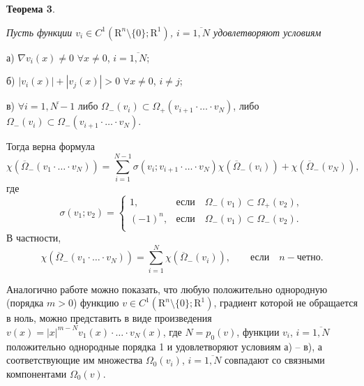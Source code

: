 {\bf Теорема 3}. {\it Пусть функции 
$v_i\in C^1(\mathrm{R}^n\setminus\{0\};\mathrm{R}^1)$, $i=\overline{1, N}$
удовлетворяют условиям

а) $\nabla v_i(x)\neq 0$ $\forall x\neq 0$, $i=\overline{1, N}$;

б) $|v_i(x)|+|v_j(x)|>0$  $\forall x\neq 0$, $i\neq j$;

в) $\forall  i=\overline{1, N-1}$ либо 
$\Omega_-(v_i)\subset \Omega_+( v_{i+1}\cdot \ldots \cdot v_N)$,
либо 
$\Omega_-(v_i)\subset \Omega_-( v_{i+1}\cdot \ldots \cdot v_N)$.

Тогда верна формула
$$
\chi(\overline{\Omega}_-(v_1\cdot \ldots \cdot v_N))=
\sum_{i=1}^{N-1}
\sigma(v_i; v_{i+1}\cdot \ldots \cdot v_N)
\chi(\overline{\Omega}_-(v_i)) +
\chi(\overline{\Omega}_-(v_N)),
$$
где
$$
\sigma(v_1; v_2)=\left\{
\begin{array}{cl}
1, & \text{если}\quad \Omega_-(v_1)\subset\Omega_+(v_2), \\
(-1)^n, & \text{если}\quad \Omega_-(v_1)\subset\Omega_-(v_2).\\
\end{array}
\right.
$$
В частности, 
$$
\chi(\overline{\Omega}_-(v_1\cdot \ldots \cdot v_N))=
\sum_{i=1}^{N}
\chi(\overline{\Omega}_-(v_i)), \qquad \text{если} \quad n - \text{четно}.
$$
}

Аналогично работе \cite[Lemma 2]{MN_IA21} можно показать, что любую положительно однородную (порядка $m>0$) функцию 
$v\in C^1(\mathrm{R}^n\setminus\{0\};\mathrm{R}^1)$,
градиент которой не обращается в ноль, можно представить в виде произведения 
$v(x)=|x|^{m-N}v_1(x)\cdot \ldots \cdot v_N(x)$, где $N=p_0(v)$,
функции $v_i$, $i=\overline{1, N}$ 
положительно однородные порядка 1 и
удовлетворяют условиям а) -- в), а соответствующие им множества $\Omega_0(v_i)$, 
$i=\overline{1, N}$ совпадают со связными компонентами $\Omega_0(v)$.

%


